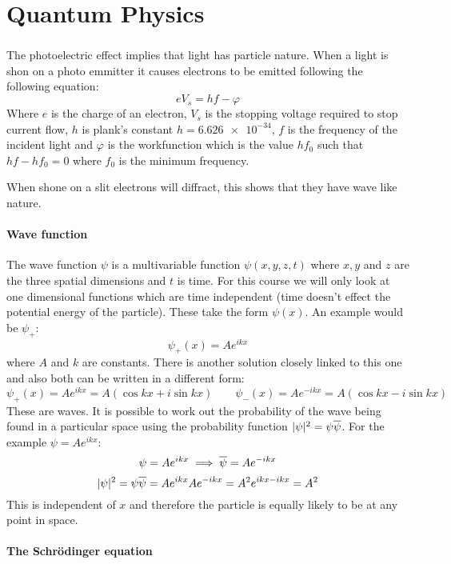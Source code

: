\part{Quantum Physics}
\section{}

The photoelectric effect implies that light has particle nature. When a light is shon on a photo emmitter it causes electrons to be emitted following the following equation:
\[eV_s=hf-\varphi\]
Where \(e\) is the charge of an electron, \(V_s\) is the stopping voltage required to stop current flow, \(h\) is plank's constant \(h=\num{6.626e-34}\), \(f\) is the frequency of the incident light and \(\varphi\) is the workfunction which is the value \(hf_0\) such that \(hf-hf_0=0\) where \(f_0\) is the minimum frequency.

When shone on a slit electrons will diffract, this shows that they have wave like nature.

\subsection*{Wave function}

The wave function \(\psi\) is a multivariable function \(\psi(x,y,z,t)\) where \(x,y\) and \(z\) are the three spatial dimensions and \(t\) is time. For this course we will only look at one dimensional functions which are time independent (time doesn't effect the potential energy of the particle). These take the form \(\psi(x)\). An example would be \(\psi_+\):
\[\psi_+(x)=Ae^{ikx}\]
where \(A\) and \(k\) are constants. There is another solution closely linked to this one and also both can be written in a different form:
\[\psi_+(x)=Ae^{ikx}=A(\cos kx+i\sin kx)\qquad\psi_-(x)=Ae^{-ikx}=A(\cos kx-i\sin kx)\]
These are waves. It is possible to work out the probability of the wave being found in a particular space using the probability function \(|\psi|^2=\psi\overline{\psi}\). For the example \(\psi=Ae^{ikx}\):
\[\psi=Ae^{ikx}\implies\overline{\psi}=Ae^{-ikx}\]
\[|\psi|^2=\psi\overline{\psi}=Ae^{ikx}Ae^{-ikx}=A^2e^{ikx-ikx}=A^2\]
This is independent of \(x\) and therefore the particle is equally likely to be at any point in space.

\subsection*{The Schr\"odinger equation}

